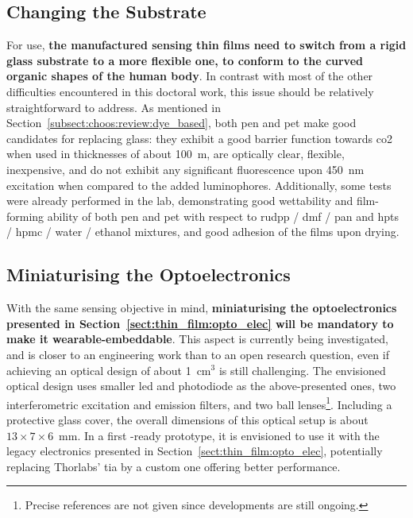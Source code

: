 \subsection{Changing the Substrate}\label{sect:conclusion:substrate}

For \invivo{} use, \textbf{the manufactured sensing thin films need to switch from a rigid glass substrate to a more flexible one, to conform to the curved organic shapes of the human body}. In contrast with most of the other difficulties encountered in this doctoral work, this issue should be relatively straightforward to address. As mentioned in Section~\ref{subsect:choos:review:dye_based}, both \gls{pen} and \gls{pet} make good candidates for replacing glass: they exhibit a good barrier function towards \gls{co2} when used in thicknesses of about 100~\textmu{}m, are optically clear, flexible, inexpensive, and do not exhibit any significant fluorescence upon 450~nm excitation when compared to the added luminophores\cite{ouchi2007}. Additionally, some tests were already performed in the lab, demonstrating good wettability and film-forming ability of both \gls{pen} and \gls{pet} with respect to \gls{rudpp} / \gls{dmf} / \gls{pan} and \gls{hpts} / \gls{hpmc} / water / ethanol mixtures, and good adhesion of the films upon drying.

\subsection{Miniaturising the Optoelectronics}\label{sect:conclusion:miniaturisation}

With the same \invivo{} sensing objective in mind, \textbf{miniaturising the optoelectronics presented in Section~\ref{sect:thin_film:opto_elec} will be mandatory to make it wearable-embeddable}. This aspect is currently being investigated, and is closer to an engineering work than to an open research question, even if achieving an optical design of about 1~cm$^3$ is still challenging. The envisioned optical design uses smaller \gls{led} and photodiode as the above-presented ones, two interferometric excitation and emission filters, and two ball lenses\footnote{Precise references are not given since developments are still ongoing.}. Including a protective glass cover, the overall dimensions of this optical setup is about $13\times7\times6$~mm. In a first \invivo{}-ready prototype, it is envisioned to use it with the legacy electronics presented in Section~\ref{sect:thin_film:opto_elec}, potentially replacing Thorlabs' \gls{tia} by a custom one offering better performance.

